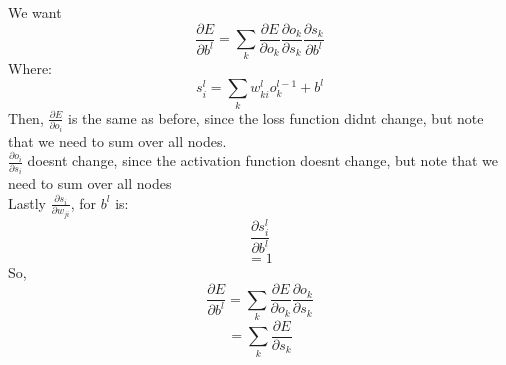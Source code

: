 \documentclass[a4paper,12pt,fleqn]{article}
\newcommand{\ult}{\vspace{12px}\noindent}
\newcommand{\partialderivative}[2]{\frac{\partial #1}{\partial #2}}
\begin{document}
\ult{bias}

We want \[ \partialderivative{E}{b^l} = \sum_k \partialderivative{E}{o_k} \partialderivative{o_k}{s_k} \partialderivative{s_k}{b^l} \]
Where: \[ s^l_i = \sum_k w^l_{ki} o^{l-1}_k + b^l \]
Then, $ \partialderivative{E}{o_i} $ is the same as before, since the loss function didnt change, but note that we need to sum over all nodes.\\
$ \partialderivative{o_i}{s_i} $  doesnt change, since the activation function doesnt change, but note that we need to sum over all nodes \\
Lastly $ \partialderivative{s_i}{w_{ji}} $, for $b^l$ is:
\[ \partialderivative{s^l_i}{b^l} \]
\[ = 1 \]
So, \[ \partialderivative{E}{b^l} = \sum_k \partialderivative{E}{o_k} \partialderivative{o_k}{s_k} \]
\[ = \sum_k \partialderivative{E}{s_k} \]
\end{document}
